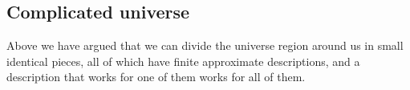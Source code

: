 \documentclass[a4paper
,draft
]{article}
\newcommand{\svn}[2][]{\todo[author=Virgil,color=red!25!white,#1]{#2}}
\def\reale{\mathbb{R}}
\newcommand{\ghilimele}[1]{``#1"}
\begin{document}







\subsection{Complicated universe}

Above we have argued that we can divide the universe region around us in small
identical pieces, all of which have finite approximate descriptions, and
a description that works for one of them works for all of them.
\end{document}
